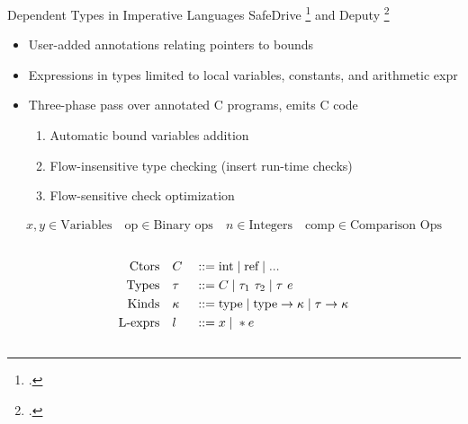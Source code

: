 \documentclass[aspectratio=169]{beamer}
\begin{document}

\begin{frame}{Dependent Types in Imperative Languages}
SafeDrive \footcite{zhou_safedrive:_2006} and Deputy \footcite{condit_dependent_2007}
\vspace{-0.1in}
    \begin{itemize}
        \item User-added annotations relating pointers to bounds
        \item Expressions in types limited to local variables, constants, and arithmetic expr
        \item Three-phase pass over annotated C programs, emits C code
            \begin{enumerate}
                \item Automatic bound variables addition
                \item Flow-insensitive type checking (insert run-time checks)
                \item Flow-sensitive check optimization
            \end{enumerate}
    \end{itemize}
\vspace{-0.3in}

\footnotesize{
\begin{gather*}
    x,y \in \text{Variables}
    \quad
    \text{op} \in \text{Binary ops}
    \quad
    n \in \text{Integers}
    \quad
    \text{comp} \in \text{Comparison Ops}
\end{gather*}

\vspace{-0.3in}

\begin{columns}[T]
\begin{column}{0.45\textwidth}
\begin{alignat*}{2}
\text{Ctors}\quad &C &&::= \text{int} \altm \text{ref} \altm ...
\\
\text{Types}\quad &\tau &&::= C \altm \tau_1 \ \tau_2 \altm \tau\ e
\\
\text{Kinds}\quad & \kappa &&::= \text{type} \altm \text{type} \rightarrow \kappa \altm \tau \rightarrow \kappa
\\
\text{L-exprs} \quad &l &&::= x \altm *e
\end{alignat*}
\end{column}


\end{columns}}
\end{frame}
\end{document}
